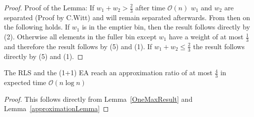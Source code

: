 \begin{proof}
    Proof of the Lemma:\newline
    If \(w_1+w_2 > \frac{2}{3}\) after time $\mathcal{O}(n)$ $w_1$ and $w_2$ are separated (Proof by C.Witt) and will remain separated afterwards. From then on the following holds. If $w_1$ is in the emptier bin, then the result follows directly by (2). Otherwise all elements in the fuller bin except $w_1$ have a weight of at most $\frac{1}{3}$ and therefore the result follows by (5) and (1). If \(w_1+w_2 \le \frac{2}{3}\) the result follows directly by (5) and (1).
\end{proof}

\begin{corollary}
    The RLS and the (1+1) EA reach an approximation ratio of at most $\frac{4}{3}$ in expected time $\mathcal{O}(n\log{}n)$
\end{corollary}
\begin{proof}
    This follows directly from Lemma~\ref{OneMaxResult} and Lemma~\ref{approximationLemma}
\end{proof}